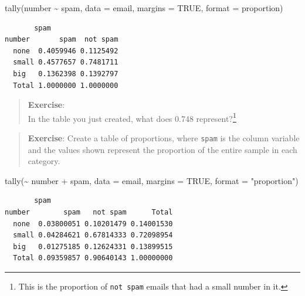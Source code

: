 \documentclass[
  letterpaper,
  DIV=11,
  numbers=noendperiod]{scrreprt}
\newenvironment{Shaded}{\begin{snugshade}}{\end{snugshade}}
\newcommand{\AttributeTok}[1]{\textcolor[rgb]{0.40,0.45,0.13}{#1}}
\newcommand{\ConstantTok}[1]{\textcolor[rgb]{0.56,0.35,0.01}{#1}}
\newcommand{\FunctionTok}[1]{\textcolor[rgb]{0.28,0.35,0.67}{#1}}
\newcommand{\NormalTok}[1]{\textcolor[rgb]{0.00,0.23,0.31}{#1}}
\newcommand{\SpecialCharTok}[1]{\textcolor[rgb]{0.37,0.37,0.37}{#1}}
\newcommand{\StringTok}[1]{\textcolor[rgb]{0.13,0.47,0.30}{#1}}
\begin{document}
\begin{Shaded}
\begin{Highlighting}[]
\FunctionTok{tally}\NormalTok{(number }\SpecialCharTok{\textasciitilde{}}\NormalTok{ spam, }\AttributeTok{data =}\NormalTok{ email, }\AttributeTok{margins =} \ConstantTok{TRUE}\NormalTok{, }\AttributeTok{format =} \StringTok{\textquotesingle{}proportion\textquotesingle{}}\NormalTok{)}
\end{Highlighting}
\end{Shaded}

\begin{verbatim}
       spam
number       spam  not spam
  none  0.4059946 0.1125492
  small 0.4577657 0.7481711
  big   0.1362398 0.1392797
  Total 1.0000000 1.0000000
\end{verbatim}

\begin{quote}
\textbf{Exercise}:\\
In the table you just created, what does 0.748 represent?\footnote{This
  is the proportion of \texttt{not\ spam} emails that had a small number
  in it.}
\end{quote}

\begin{quote}
\textbf{Exercise}: Create a table of proportions, where \texttt{spam} is
the column variable and the values shown represent the proportion of the
entire sample in each category.
\end{quote}

\begin{Shaded}
\begin{Highlighting}[]
\FunctionTok{tally}\NormalTok{(}\SpecialCharTok{\textasciitilde{}}\NormalTok{ number }\SpecialCharTok{+}\NormalTok{ spam, }\AttributeTok{data =}\NormalTok{ email, }\AttributeTok{margins =} \ConstantTok{TRUE}\NormalTok{, }\AttributeTok{format =} \StringTok{"proportion"}\NormalTok{)}
\end{Highlighting}
\end{Shaded}

\begin{verbatim}
       spam
number        spam   not spam      Total
  none  0.03800051 0.10201479 0.14001530
  small 0.04284621 0.67814333 0.72098954
  big   0.01275185 0.12624331 0.13899515
  Total 0.09359857 0.90640143 1.00000000
\end{verbatim}
\end{document}
